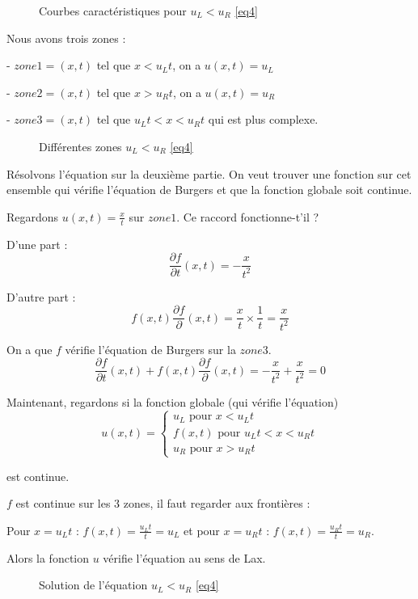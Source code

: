 \documentclass{article}
\begin{document}
\begin{figure}
  
  \caption{Courbes caractéristiques pour $u_L < u_R$ \ref{eq4}}
\end{figure}

Nous avons trois zones :

- $zone1 = (x,t)$ tel que $x < u_L t$, on a $u(x,t) = u_L$

- $zone2 = (x,t)$ tel que $x > u_R t$, on a $u(x,t) = u_R$

- $zone3 = (x,t)$ tel que $u_L t < x < u_R t$ qui est plus complexe.

\begin{figure}
  
  \caption{Différentes zones $u_L < u_R$ \ref{eq4}}
\end{figure}

Résolvons l'équation sur la deuxième partie. On veut trouver une fonction sur cet ensemble qui vérifie l'équation de Burgers et que la fonction globale soit continue.

Regardons $u(x,t) = \frac{x}{t}$ sur $zone1$. Ce raccord fonctionne-t'il ?

D'une part :
\[ \frac{\partial f}{\partial t}(x,t) = -\frac{x}{t^2} \]


D'autre part :
\[ f(x,t) \frac{\partial f}{\partial}(x,t) = \frac{x}{t} \times \frac{1}{t} = \frac{x}{t^2} \]

On a que $f$ vérifie l'équation de Burgers sur la $zone3$.
\[ \frac{\partial f}{\partial t}(x,t) + f(x,t) \frac{\partial f}{\partial}(x,t) = -\frac{x}{t^2} + \frac{x}{t^2} = 0 \]

Maintenant, regardons si la fonction globale  (qui vérifie l'équation)
\[
u(x,t) = \left\{ \begin{matrix}
			u_L \text{ pour } x < u_L t \\
			f(x,t) \text{ pour } u_L t < x < u_R t \\
			u_R \text{ pour } x > u_R t
\end{matrix} \right.
\tag{Sol4.1}
\]

est continue.

$f$ est continue sur les 3 zones, il faut regarder aux frontières :

Pour $x = u_L t$ : $f(x,t) = \frac{u_L t}{t} = u_L$ et pour $x = u_R t$ : $f(x,t) = \frac{u_R t}{t} = u_R$.
\newline

Alors la fonction $u$ vérifie l'équation au sens de Lax.

\begin{figure}
  
  \caption{Solution de l'équation $u_L < u_R$ \ref{eq4}}
\end{figure}
\end{document}
